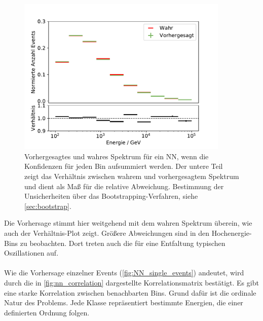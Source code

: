 \begin{figure}
    \centering
    \includegraphics[width=0.9\textwidth]{Plots/NN/spectrum_dist_10bins_50ep_500000samples_200pulls.pdf}
    \caption[Spektrum des NN ohne DSEA mit Beachtung der Wahrscheinlichkeitsinterpretation]{Vorhergesagtes und wahres Spektrum für ein NN, wenn die Konfidenzen für jeden Bin aufsummiert werden.
    Der untere Teil zeigt das Verhältnis zwischen wahrem und vorhergesagtem Spektrum und dient als Maß für die relative Abweichung.
    Bestimmung der Unsicherheiten über das Bootstrapping-Verfahren, siehe \autoref{sec:bootstrap}.
    }
    \label{fig:NN_spectrum}
\end{figure}
Die Vorhersage stimmt hier weitgehend mit dem wahren Spektrum überein, wie auch der Verhältnis-Plot zeigt.
Größere Abweichungen sind in den Hochenergie-Bins zu beobachten.
Dort treten auch die für eine Entfaltung typischen Oszillationen auf.
\\
\\
Wie die Vorhersage einzelner Events (\autoref{fig:NN_single_events}) andeutet, wird durch die in \autoref{fig:nn_correlation} dargestellte Korrelationsmatrix bestätigt.
Es gibt eine starke Korrelation zwischen benachbarten Bins.
Grund dafür ist die ordinale Natur des Problems.
Jede Klasse repräsentiert bestimmte Energien, die einer definierten Ordnung folgen.
